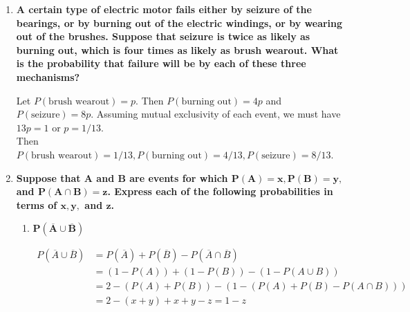 \documentclass[10pt, oneside]{article}   	%
\theoremstyle{definition}
\begin{document}
\begin{enumerate}[label=1.\arabic*]
\begin{proof}
Substituting $P(A \cap \overline{B}) = P(A) - P(A \cap B)$ and $P(B \cap \overline{A}) = P(B) - P(A \cap B)$ yields our desired result.

\end{proof}

\item  \begin{tcolorbox}[
  colback=Cerulean!5!white,
  colframe=Cerulean!75!black]
\textbf{A certain type of electric motor fails either by seizure of the bearings, or by burning out of the electric windings, or by wearing out of the brushes. Suppose that seizure is twice as likely as burning out, which is four times as likely as brush wearout. What is the probability that failure will be by each of these three mechanisms?}
\end{tcolorbox}

Let $P(\text{brush wearout}) = p$. Then $P(\text{burning out}) = 4p$ and $P(\text{seizure}) = 8p$. Assuming mutual exclusivity of each event, we must have $13p = 1$ or $p = 1/13$. \\
Then $\boxed{P(\text{brush wearout}) = 1/13, P(\text{burning out}) = 4/13, P(\text{seizure}) = 8/13}$.

\item  \begin{tcolorbox}[
  colback=Cerulean!5!white,
  colframe=Cerulean!75!black]
\textbf{Suppose that $\bm{A}$ and $\bm{B}$ are events for which $\bm{P(A) = x, P(B) = y,}$ and $\bm{P(A \cap B) = z}$. Express each of the following probabilities in terms of $\bm{x, y,}$ and $\bm{z}$.}
\end{tcolorbox}

	\begin{enumerate}
	\item  \begin{tcolorbox}[
	  colback=Cerulean!5!white,
	  colframe=Cerulean!75!black]
	\textbf{$\bm{P(\overline{A} \cup \overline{B})}$}
	\end{tcolorbox}
	
	\begin{align*}
	P(\overline{A} \cup \overline{B}) &= P(\overline{A}) + P(\overline{B}) - P(\overline{A} \cap \overline{B}) \\
	&= (1 - P(A)) + (1 - P(B)) - (1 - P(A \cup B)) \\
	&= 2 - (P(A) + P(B)) - (1 - (P(A) + P(B) - P(A \cap B))) \\
	&= 2 - (x+y) + x + y - z = \boxed{1 - z}
	\end{align*}
	

\end{enumerate}
\end{enumerate}
\end{document}

